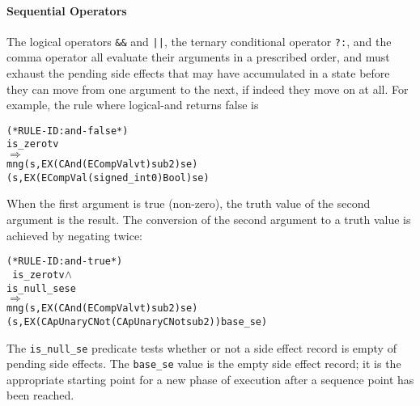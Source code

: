 \documentclass[11pt]{article}
\begin{document}
\paragraph{Sequential Operators}
The logical operators \texttt{\&\&} and \texttt{||}, the ternary
conditional operator \texttt{?:}, and the comma operator all evaluate
their arguments in a prescribed order, and must exhaust the pending
side effects that may have accumulated in a state before they can move
from one argument to the next, if indeed they move on at all.   For
example, the rule where logical-and returns false is
%
\begin{alltt}
(* RULE-ID: and-false *)
     is_zero t v
   \(\Rightarrow\)
     mng (s, EX (CAnd (ECompVal v t) sub2) se)
         (s, EX (ECompVal (signed_int 0) Bool) se)
\end{alltt}
When the first argument is true (non-zero), the truth value of the
second argument is the result.  The conversion of the second argument
to a truth value is achieved by negating twice:
%
\begin{alltt}
(* RULE-ID: and-true *)
     ~is_zero t v \(\land\)
     is_null_se se
   \(\Rightarrow\)
     mng (s, EX (CAnd (ECompVal v t) sub2) se)
         (s, EX (CApUnary CNot (CApUnary CNot sub2)) base_se)
\end{alltt}
%
The \texttt{is_null_se} predicate tests whether or not a side effect
record is empty of pending side effects.
%
The \texttt{base_se} value is the empty side effect record; it is the
appropriate starting point for a new phase of execution after a
sequence point has been reached.
\end{document}
